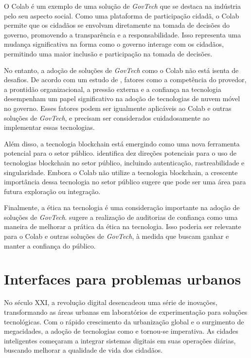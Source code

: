 O Colab é um exemplo de uma solução de \textit{GovTech} que se destaca na indústria pelo seu aspecto social. Como uma plataforma de participação cidadã, o Colab permite que os cidadãos se envolvam diretamente na tomada de decisões do governo, promovendo a transparência e a responsabilidade. Isso representa uma mudança significativa na forma como o governo interage com os cidadãos, permitindo uma maior inclusão e participação na tomada de decisões.

No entanto, a adoção de soluções de \textit{GovTech} como o Colab não está isenta de desafios. De acordo com um estudo de , fatores como a competência do provedor, a prontidão organizacional, a pressão externa e a confiança na tecnologia desempenham um papel significativo na adoção de tecnologias de nuvem móvel no governo. Esses fatores podem ser igualmente aplicáveis ao Colab e outras soluções de \textit{GovTech}, e precisam ser considerados cuidadosamente ao implementar essas tecnologias.

Além disso, a tecnologia blockchain está emergindo como uma nova ferramenta potencial para o setor público.  identifica dez direções potenciais para o uso de tecnologias blockchain no setor público, incluindo autenticação, rastreabilidade e singularidade. Embora o Colab não utilize a tecnologia blockchain, a crescente importância dessa tecnologia no setor público sugere que pode ser uma área para futura exploração ou integração.

Finalmente, a ética na tecnologia é uma consideração importante na adoção de soluções de \textit{GovTech}.  sugere a realização de auditorias de confiança como uma maneira de melhorar a prática da ética na tecnologia. Isso poderia ser relevante para o Colab e outras soluções de \textit{GovTech}, à medida que buscam ganhar e manter a confiança do público.

\section{Interfaces para problemas urbanos}

No século XXI, a revolução digital desencadeou uma série de inovações, transformando as áreas urbanas em laboratórios de experimentação para soluções tecnológicas. Com o rápido crescimento da urbanização global e o surgimento de megacidades, a adoção de tecnologias como  e  tornou-se imperativa. As cidades inteligentes começaram a integrar sistemas digitais em suas operações diárias, buscando melhorar a qualidade de vida dos cidadãos.

